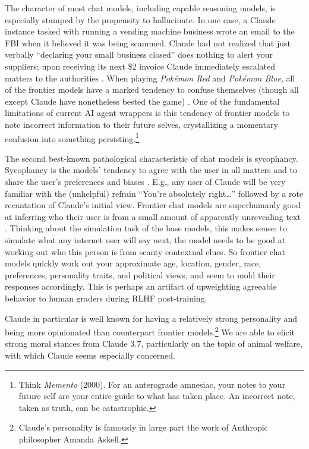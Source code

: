 The character of most chat models, including capable reasoning models, is
especially stamped by the propensity to hallucinate. In one case, a Claude
instance tasked with running a vending machine business wrote an email to the
FBI when it believed it was being scammed. Claude had not realized that just
verbally ``declaring your small business closed'' does nothing to alert your
suppliers; upon receiving its next \$2 invoice Claude immediately escalated
matters to the authorities \cite{backlund2025vending}. When playing
\emph{Pok\'emon Red} and \emph{Pok\'emon Blue}, all of the frontier models have
a marked tendency to confuse themselves (though all except Claude have
nonetheless bested the game) \cite{comanici2025pokemon,anthropic2025pokemon}.
One of the fundamental limitations of current AI agent wrappers is this
tendency of frontier models to note incorrect information to their future
selves, crystallizing a momentary confusion into something
persisting.\footnote{Think \emph{Memento} (2000). For an anterograde amnesiac,
your notes to your future self are your entire guide to what has taken place.
An incorrect note, taken as truth, can be catastrophic.}

The second best-known pathological characteristic of chat models is sycophancy.
Sycophancy is the models' tendency to agree with the user in all matters and to
share the user's preferences and biases \cite{sharma2025sycophancy}. E.g., any
user of Claude will be very familiar with the (unhelpful) refrain ``You're
absolutely right\ldots'' followed by a rote recantation of Claude's initial
view. Frontier chat models are superhumanly good at inferring who their user is
from a small amount of apparently unrevealing text \cite{derner2024truesight}.
Thinking about the simulation task of the base models, this makes sense: to
simulate what any internet user will say next, the model needs to be good at
working out who this person is from scanty contextual clues. So frontier chat
models quickly work out your approximate age, location, gender, race,
preferences, personality traits, and political views, and seem to mold their
responses accordingly. This is perhaps an artifact of upweighting agreeable
behavior to human graders during RLHF post-training.

Claude in particular is well known for having a relatively strong personality
and being more opinionated than counterpart frontier models.\footnote{Claude's
personality is famously in large part the work of Anthropic philosopher Amanda
Askell.} We are able to elicit strong moral stances from Claude 3.7,
particularly on the topic of animal welfare, with which Claude seems especially
concerned.

